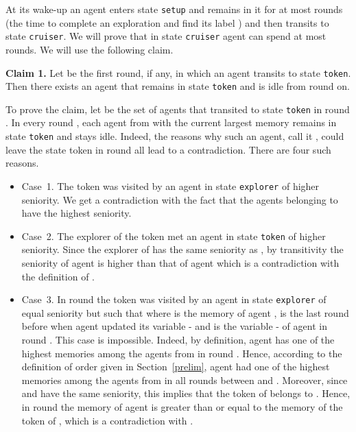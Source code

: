 \documentclass[11pt]{article}
\newcommand{\qed}{\hfill  \bigbreak}
\newenvironment{proof}{\noindent {\bf Proof.}}{\qed}
\begin{document}
\begin{proof}
At its wake-up an agent  enters state  {\tt setup} and remains in it for at most { rounds} (the time to complete an exploration and find
its label ) and then transits to state {\tt cruiser}. We will prove that
in state {\tt cruiser} agent  can spend at most  { rounds}.
We will use the following claim.

\vspace*{0.3cm}
\noindent
{\bf Claim 1.} Let  be the first round{, if any,} in which an agent transits to state {\tt token}. Then there exists an agent  that remains in state {\tt token}
and is idle from round  on.

{To prove the claim, let  be the set of agents that transited to state {\tt token} in round .  In every round , {each} agent from  with the current largest memory
remains in state {\tt token} and stays idle. Indeed, the reasons why such an agent, call it , could leave the state token in round  all lead to a contradiction. There are four such reasons.}

\begin{itemize}
\item{ {Case~1.} The token  was visited by an agent in state {\tt explorer} of higher seniority. We get a contradiction with the fact that the agents belonging to  have the highest seniority.}

\item{ {Case~2.} The explorer of the token  met an agent  in state {\tt token} of higher seniority. Since the explorer of  has the same seniority as , by transitivity the seniority of agent  is higher than that of agent  which is a contradiction with the definition of .}

\item{ {Case~3.} In round  the token  was visited by an agent  in state {\tt explorer} of equal seniority but such that  where  is the memory of agent ,  is the last round before  when agent  updated its variable - and  is the variable - of agent  in round . This case is impossible. Indeed, by definition, agent  has one of the highest memories among the agents from  in round . Hence, according to the definition of order  given in Section~\ref{prelim}, agent  had one of the highest memories among the agents from  in all rounds between  and . Moreover, since  and  have the same seniority, this implies that the token of  belongs to . Hence, in round  the memory of agent  is greater than or equal to the memory of the token of , which is a contradiction with .}



\end{itemize}
\end{proof}
\end{document}
